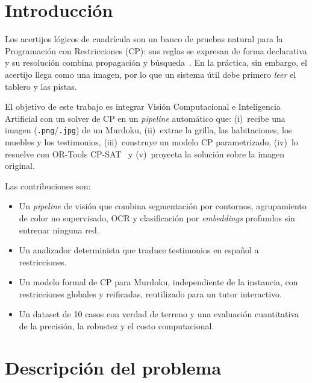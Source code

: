 \documentclass[conference,a4paper]{IEEEtran}
\begin{document}
\section{Introducción}

Los acertijos lógicos de cuadrícula son un banco de pruebas natural para la
Programación con Restricciones (CP): sus reglas se expresan de forma declarativa y su
resolución combina propagación y búsqueda~\cite{rossi2006handbook}. En la práctica, sin
embargo, el acertijo llega como una imagen, por lo que un sistema útil debe primero
\emph{leer} el tablero y las pistas.

El objetivo de este trabajo es integrar Visión Computacional e Inteligencia Artificial con un
solver de CP en un \emph{pipeline} automático que: (i)~recibe una imagen
(\texttt{.png}/\texttt{.jpg}) de un Murdoku, (ii)~extrae la grilla, las habitaciones, los
muebles y los testimonios, (iii)~construye un modelo CP parametrizado, (iv)~lo resuelve con
OR-Tools CP-SAT~\cite{ortools} y (v)~proyecta la solución sobre la imagen original.

Las contribuciones son:
\begin{itemize}
  \item Un \emph{pipeline} de visión que combina segmentación por contornos, agrupamiento
        de color no supervisado, OCR y clasificación por \emph{embeddings} profundos sin
        entrenar ninguna red.
  \item Un analizador determinista que traduce testimonios en español a restricciones.
  \item Un modelo formal de CP para Murdoku, independiente de la instancia, con
        restricciones globales y reificadas, reutilizado para un tutor interactivo.
  \item Un dataset de 10 casos con verdad de terreno y una evaluación cuantitativa de la
        precisión, la robustez y el costo computacional.
\end{itemize}

\section{Descripción del problema}
\end{document}
